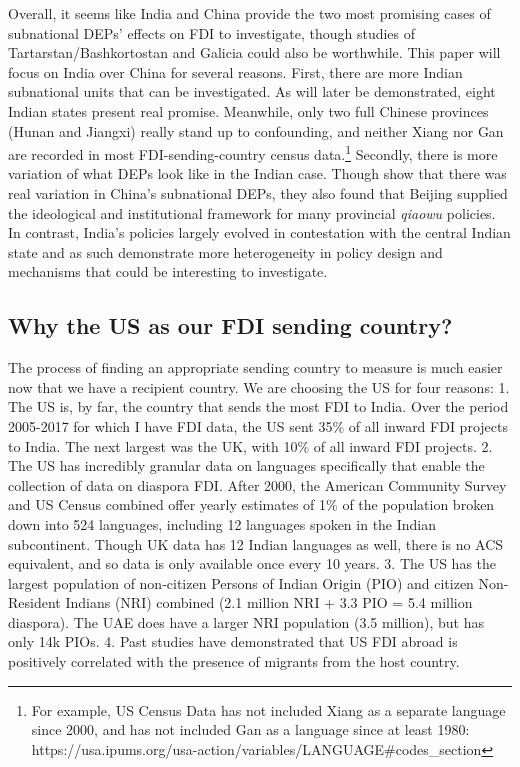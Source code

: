 \documentclass[12pt]{article}
\let\oldsubsection\subsection
\renewcommand{\subsection}{\FloatBarrier\oldsubsection}
\begin{document}
    Overall, it seems like India and China provide the two most promising cases of subnational DEPs' effects on FDI to investigate, though studies of Tartarstan/Bashkortostan and Galicia could also be worthwhile. This paper will focus on India over China for several reasons. First, there are more Indian subnational units that can be investigated. As will later be demonstrated, eight Indian states present real promise. Meanwhile, only two full Chinese provinces (Hunan and Jiangxi) really stand up to confounding, and neither Xiang nor Gan are recorded in most FDI-sending-country census data.\footnote{For example, US Census Data has not included Xiang as a separate language since 2000, and has not included Gan as a language since at least 1980: https://usa.ipums.org/usa-action/variables/LANGUAGE\#codes\_section} Secondly, there is more variation of what DEPs look like in the Indian case. Though \citeauthor{liu_chinas_2016} show that there was real variation in China's subnational DEPs, they also found that Beijing supplied the ideological and institutional framework for many provincial \textit{qiaowu} policies. In contrast, India's policies largely evolved in contestation with the central Indian state \citep{sharma_partisan_2020} and as such demonstrate more heterogeneity in policy design and mechanisms that could be interesting to investigate.

\subsection{Why the US as our FDI sending country?} \label{ss:why the us?}
    The process of finding an appropriate sending country to measure is much easier now that we have a recipient country. We are choosing the US for four reasons:
    1. The US is, by far, the country that sends the most FDI to India. Over the period 2005-2017 for which I have FDI data, the US sent 35\% of all inward FDI projects to India. The next largest was the UK, with 10\% of all inward FDI projects.
    2. The US has incredibly granular data on languages specifically that enable the collection of data on diaspora FDI. After 2000, the American Community Survey and US Census combined offer yearly estimates of 1\% of the population broken down into 524 languages, including 12 languages spoken in the Indian subcontinent. \citep{noauthor_ipums_nodate} Though UK data has 12 Indian languages as well, there is no ACS equivalent, and so data is only available once every 10 years. \citep{service_language_nodate}
    3. The US has the largest population of non-citizen Persons of Indian Origin (PIO) and citizen Non-Resident Indians (NRI) combined (2.1 million NRI + 3.3 PIO = 5.4 million diaspora). The UAE does have a larger NRI population (3.5 million), but has only 14k PIOs. \citet{noauthor_population_nodate}
    4. Past studies have demonstrated that US FDI abroad is positively correlated with the presence of migrants from the host country. \citet{javorcik_migrant_2011}
\end{document}
